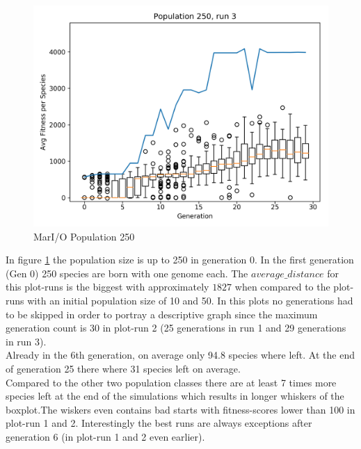 \begin{figure}[h]
\begin{minipage}{0.33\textwidth}
				\end{minipage}
				\begin{minipage}{0.33\textwidth}
					\centering
					\includegraphics[width=1\textwidth]{graphics/mario/pop250_run3} %
				\end{minipage}
				\caption{MarI/O Population 250}
				\label{fig:mario250}
			\end{figure}
			In figure \ref{fig:mario250} the population size is up to 250 in generation 0. In the first generation (Gen 0) 250 species are born with one genome each. The $average\_distance$ for this plot-runs is the biggest with approximately $1827$ when compared to the plot-runs with an initial population size of 10 and 50. In this plots no generations had to be skipped in order to portray a descriptive graph since the maximum generation count is 30 in plot-run 2 (25 generations in run 1 and 29 generations in run 3).\\
			Already in the 6th generation, on average only 94.8 species where left. At the end of generation 25 there where 31 species left on average. \\
			Compared to the other two population classes there are at least 7 times more species left at the end of the simulations which results in longer whiskers of the boxplot.The wiskers even contains bad starts with fitness-scores lower than 100 in plot-run 1 and 2. Interestingly the best runs are always exceptions after generation 6 (in plot-run 1 and 2 even earlier). \\
